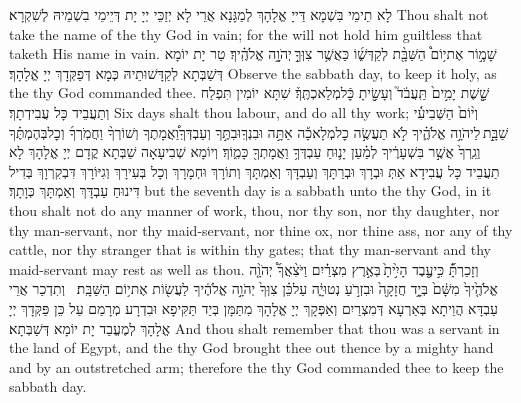 {לָא תֵימֵי בִּשְׁמָא דַּייָ אֱלָהָךְ לְמַגָּנָא אֲרֵי לָא יְזַכֵּי יְיָ יָת דְּיֵימֵי בִשְׁמֵיהּ לְשִׁקְרָא׃}
{Thou shalt not take the name of the \lord\space thy God in vain; for the \lord\space will not hold him guiltless that taketh His name in vain.}{}
{שָׁמ֛֣וֹר אֶת\maqqaf י֥וֹם֩ הַשַּׁבָּ֖֨ת לְקַדְּשׁ֑֜וֹ כַּאֲשֶׁ֥ר צִוְּךָ֖֣ \legarmeh  יְהֹוָ֥֣ה אֱלֹהֶֽ֗יךָ׃}
{טַר יָת יוֹמָא דְּשַׁבְּתָא לְקַדָּשׁוּתֵיהּ כְּמָא דְּפַקְּדָךְ יְיָ אֱלָהָךְ׃}
{Observe the sabbath day, to keep it holy, as the \lord\space thy God commanded thee.}{}
{שֵׁ֤֣שֶׁת יָמִ֣ים֙ תַּֽעֲבֹ֔ד֮ וְעָשִׂ֖֣יתָ כׇּֿל\maqqaf מְלַאכְתֶּֽךָ֒׃}
{שִׁתָּא יוֹמִין תִּפְלַח וְתַעֲבֵיד כָּל עֲבִידְתָךְ׃}
{Six days shalt thou labour, and do all thy work;}{}
{וְי֨וֹם֙ הַשְּׁבִיעִ֔֜י שַׁבָּ֖֣ת \legarmeh  לַיהֹוָ֣ה אֱלֹהֶ֑֗יךָ לֹ֣א תַעֲשֶׂ֣ה כׇל\maqqaf מְלָאכָ֡ה אַתָּ֣ה וּבִנְךָֽ\maqqaf וּבִתֶּ֣ךָ וְעַבְדְּךָֽ\maqqaf וַ֠אֲמָתֶךָ וְשׁוֹרְךָ֨ וַחֲמֹֽרְךָ֜ וְכׇל\maqqaf בְּהֶמְתֶּ֗ךָ וְגֵֽרְךָ֙ אֲשֶׁ֣ר בִּשְׁעָרֶ֔יךָ לְמַ֗עַן יָנ֛וּחַ עַבְדְּךָ֥ וַאֲמָתְךָ֖ כָּמֽ֑וֹךָ׃}
{וְיוֹמָא שְׁבִיעָאָה שַׁבְּתָא קֳדָם יְיָ אֱלָהָךְ לָא תַעֲבֵיד כָּל עֲבִידָא אַתְּ וּבְרָךְ וּבְרַתָּךְ וְעַבְדָּךְ וְאַמְתָּךְ וְתוֹרָךְ וּחְמָרָךְ וְכָל בְּעִירָךְ וְגִיּוֹרָךְ דִּבְקִרְוָךְ בְּדִיל דִּינוּחַ עַבְדָּךְ וְאַמְתָּךְ כְּוָתָךְ׃}
{but the seventh day is a sabbath unto the \lord\space thy God, in it thou shalt not do any manner of work, thou, nor thy son, nor thy daughter, nor thy man-servant, nor thy maid-servant, nor thine ox, nor thine ass, nor any of thy cattle, nor thy stranger that is within thy gates; that thy man-servant and thy maid-servant may rest as well as thou.}{}
{וְזָכַרְתָּ֗֞ כִּ֣י\maqqaf עֶ֤֥בֶד הָיִ֣֙יתָ֙ \legarmeh  בְּאֶ֣רֶץ מִצְרַ֔֗יִם וַיֹּצִ֨אֲךָ֜֩ יְהֹוָ֤֨ה אֱלֹהֶ֤֙יךָ֙ מִשָּׁ֔ם֙ בְּיָ֥֤ד חֲזָקָ֖ה֙ וּבִזְרֹ֣עַ נְטוּיָ֑֔ה עַל\maqqaf כֵּ֗ן צִוְּךָ֙ יְהֹוָ֣ה אֱלֹהֶ֔יךָ לַעֲשׂ֖וֹת אֶת\maqqaf י֥וֹם הַשַּׁבָּֽת׃ \setuma }
{וְתִדְכַר אֲרֵי עַבְדָּא הֲוֵיתָא בְּאַרְעָא דְּמִצְרַיִם וְאַפְּקָךְ יְיָ אֱלָהָךְ מִתַּמָּן בְּיַד תַּקִּיפָא וּבִדְרָע מְרָמַם עַל כֵּן פַּקְּדָךְ יְיָ אֱלָהָךְ לְמֶעֱבַד יָת יוֹמָא דְּשַׁבְּתָא׃}
{And thou shalt remember that thou was a servant in the land of Egypt, and the \lord\space thy God brought thee out thence by a mighty hand and by an outstretched arm; therefore the \lord\space thy God commanded thee to keep the sabbath day.}{}
